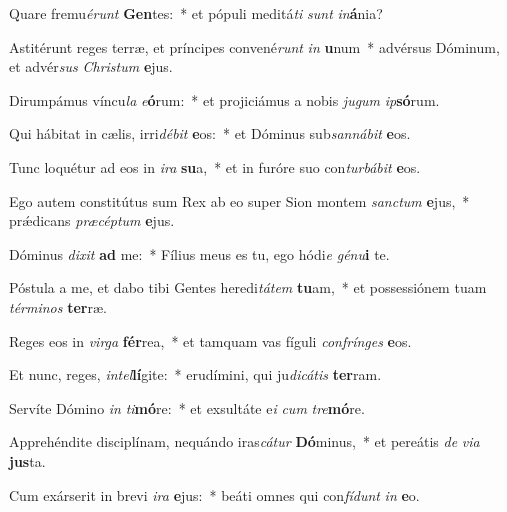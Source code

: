 \item Quare fremu\textit{é}\textit{runt} \textbf{Gen}tes:~* et pópuli meditá\textit{ti} \textit{sunt} \textit{in}\textbf{á}nia?
\item Astitérunt reges terræ, et príncipes convené\textit{runt} \textit{in} \textbf{u}num~* advérsus Dóminum, et advér\textit{sus} \textit{Chris}\textit{tum} \textbf{e}jus.
\item Dirumpámus víncu\textit{la} \textit{e}\textbf{ó}rum:~* et projiciámus a nobis \textit{ju}\textit{gum} \textit{ip}\textbf{só}rum.
\item Qui hábitat in cælis, irri\textit{dé}\textit{bit} \textbf{e}os:~* et Dóminus sub\textit{san}\textit{ná}\textit{bit} \textbf{e}os.
\item Tunc loquétur ad eos in \textit{i}\textit{ra} \textbf{su}a,~* et in furóre suo con\textit{tur}\textit{bá}\textit{bit} \textbf{e}os.
\item Ego autem constitútus sum Rex ab eo super Sion montem \textit{sanc}\textit{tum} \textbf{e}jus,~* prǽdicans \textit{præ}\textit{cép}\textit{tum} \textbf{e}jus.
\item Dóminus \textit{di}\textit{xit} \textbf{ad} me:~* Fílius meus es tu, ego hódi\textit{e} \textit{gé}\textit{nu}\textbf{i} te.
\item Póstula a me, et dabo tibi Gentes heredi\textit{tá}\textit{tem} \textbf{tu}am,~* et possessiónem tuam \textit{tér}\textit{mi}\textit{nos} \textbf{ter}ræ.
\item Reges eos in \textit{vir}\textit{ga} \textbf{fér}rea,~* et tamquam vas fíguli \textit{con}\textit{frín}\textit{ges} \textbf{e}os.
\item Et nunc, reges, \textit{in}\textit{tel}\textbf{lí}gite:~* erudímini, qui ju\textit{di}\textit{cá}\textit{tis} \textbf{ter}ram.
\item Servíte Dómino \textit{in} \textit{ti}\textbf{mó}re:~* et exsultáte e\textit{i} \textit{cum} \textit{tre}\textbf{mó}re.
\item Apprehéndite disciplínam, nequándo iras\textit{cá}\textit{tur} \textbf{Dó}minus,~* et pereátis \textit{de} \textit{vi}\textit{a} \textbf{jus}ta.
\item Cum exárserit in brevi \textit{i}\textit{ra} \textbf{e}jus:~* beáti omnes qui con\textit{fí}\textit{dunt} \textit{in} \textbf{e}o.
